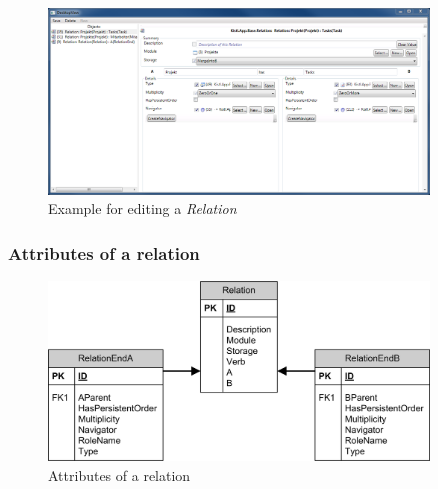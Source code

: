 \begin{figure}[ht]
	\begin{center}
		\includegraphics[width=0.9\textwidth]{images/ScreenShot_Rel_Project_Task.png}
		\caption{Example for editing a \emph{Relation}}
		\label{example_for_editing_relation}
	\end{center}
\end{figure}

\subsubsection{Attributes of a relation}

\begin{figure}[ht]
	\begin{center}
		\includegraphics[width=0.9\textwidth]{images/Rel_Attributes.png}
		\caption{Attributes of a relation}
		\label{attributes_of_a_relation}
	\end{center}
\end{figure}


